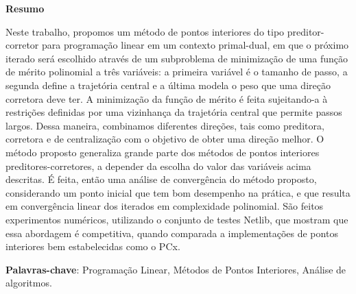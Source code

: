 \begin{center}
  \large{\textbf{Resumo}}
\end{center}

Neste trabalho, propomos um método de pontos interiores do tipo preditor-corretor para programação linear em um contexto primal-dual, em que o próximo iterado será escolhido através de um subproblema de minimização de uma função de mérito polinomial a três variáveis: a primeira variável é o tamanho de passo, a segunda define a trajetória central e a última modela o peso que uma direção corretora deve ter.  A minimização da função de mérito é feita  sujeitando-a à restrições  definidas por uma vizinhança da trajetória central que permite passos largos. Dessa maneira, combinamos diferentes direções, tais como preditora, corretora e de centralização com o objetivo de obter uma direção melhor. O método proposto generaliza grande parte dos métodos de pontos interiores preditores-corretores, a depender da escolha do valor das variáveis  acima descritas. É feita, então uma análise de convergência do método proposto, considerando um ponto inicial que tem bom desempenho na prática, e que resulta em convergência linear dos iterados em complexidade polinomial. São feitos experimentos numéricos, utilizando o conjunto de testes Netlib, que mostram que essa abordagem é competitiva, quando comparada a implementações de pontos interiores bem estabelecidas como o PCx.





\textbf{Palavras-chave}:
Programação Linear, Métodos de Pontos Interiores, Análise de algoritmos.
